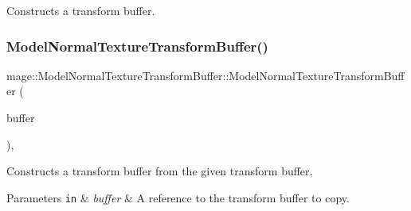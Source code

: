 Constructs a transform buffer. \hypertarget{structmage_1_1_model_normal_texture_transform_buffer_a5e8fd0dca3dbc3df825dae563ee327b6}{}\label{structmage_1_1_model_normal_texture_transform_buffer_a5e8fd0dca3dbc3df825dae563ee327b6} 
\subsubsection{\texorpdfstring{Model\+Normal\+Texture\+Transform\+Buffer()}{ModelNormalTextureTransformBuffer()}\hspace{0.1cm}{\footnotesize\ttfamily [2/3]}}
{\footnotesize\ttfamily mage\+::\+Model\+Normal\+Texture\+Transform\+Buffer\+::\+Model\+Normal\+Texture\+Transform\+Buffer (\begin{DoxyParamCaption}\item[{const \hyperlink{structmage_1_1_model_normal_texture_transform_buffer}{Model\+Normal\+Texture\+Transform\+Buffer} \&}]{buffer }\end{DoxyParamCaption})\hspace{0.3cm}{\ttfamily [default]}, {\ttfamily [noexcept]}}

Constructs a transform buffer from the given transform buffer.


\begin{DoxyParams}[1]{Parameters}
\mbox{\tt in}  & {\em buffer} & A reference to the transform buffer to copy. \\
\hline
\end{DoxyParams}
\hypertarget{structmage_1_1_model_normal_texture_transform_buffer_aac8f942f736ffb92ad9e007bd63df9da}{}\label{structmage_1_1_model_normal_texture_transform_buffer_aac8f942f736ffb92ad9e007bd63df9da} 
